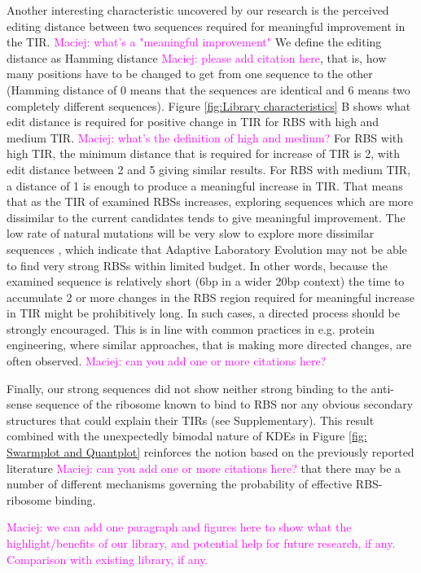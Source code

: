 \documentclass{article}
\newcommand{\mengyan}[1]{\textcolor{magenta}{#1}}
\begin{document}
Another interesting characteristic uncovered by our research is the perceived editing distance between two sequences required for meaningful improvement in the TIR. 
\mengyan{Maciej: what's a "meaningful improvement"}
We define the editing distance as Hamming distance \mengyan{Maciej: please add citation here}, that is, how many positions have to be changed to get from one sequence to the other (Hamming distance of 0 means that the sequences are identical and 6 means two completely different sequences).
Figure \ref{fig:Library characteristics} B shows what edit distance is required for positive change in TIR for RBS with high and medium TIR. \mengyan{Maciej: what's the definition of high and medium?}
For RBS with high TIR, the minimum distance that is required for increase of TIR is 2, with edit distance between 2 and 5 giving similar results.
For RBS with medium TIR, a distance of 1 is enough to produce a meaningful increase in TIR.
That means that as the TIR of examined RBSs increases, 
exploring sequences which are more dissimilar to the current candidates tends to give meaningful improvement. 
The low rate of natural mutations will be very slow to explore more dissimilar sequences \cite{Lee2012},
which indicate that Adaptive Laboratory Evolution may not be able to find very strong RBSs within limited budget.  
In other words, because the examined sequence is relatively short (6bp in a wider 20bp context) the time to accumulate 2 or more changes in the RBS region required for meaningful increase in TIR might be prohibitively long.
In such cases, a directed process should be strongly encouraged.
This is in line with common practices in e.g. protein engineering, where similar approaches, that is making more directed changes, are often observed.
\mengyan{Maciej: can you add one or more citations here?}

Finally, our strong sequences did not show neither strong binding to the anti-sense sequence of the ribosome known to bind to RBS nor any obvious secondary structures that could explain their TIRs (see Supplementary).
This result combined with the unexpectedly bimodal nature of KDEs in Figure \ref{fig: Swarmplot and Quantplot} reinforces the notion based on the previously reported literature \mengyan{Maciej: can you add one or more citations here?} that there may be a number of different mechanisms governing the probability of effective RBS-ribosome binding.

\mengyan{Maciej: we can add one paragraph and figures here to show what the highlight/benefits of our library, and potential help for future research, if any. Comparison with existing library, if any.}
\end{document}

